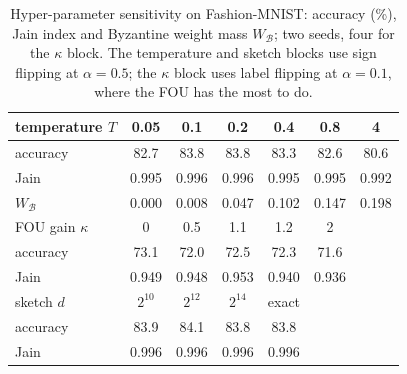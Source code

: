 \begin{table}[!t]
\centering
\caption{Hyper-parameter sensitivity on Fashion-MNIST: accuracy (\%), Jain index and Byzantine weight mass $W_{\mathcal{B}}$; two seeds, four for the $\kappa$ block. The temperature and sketch blocks use sign flipping at $\alpha=0.5$; the $\kappa$ block uses label flipping at $\alpha=0.1$, where the FOU has the most to do.}
\label{tab:sens}
\setlength{\tabcolsep}{3.2pt}
\footnotesize
\begin{tabular}{lcccccc}
\hline
temperature $T$ & 0.05 & 0.1 & 0.2 & 0.4 & 0.8 & 4\\
\hline
accuracy & 82.7 & 83.8 & 83.8 & 83.3 & 82.6 & 80.6\\
Jain & 0.995 & 0.996 & 0.996 & 0.995 & 0.995 & 0.992\\
$W_{\mathcal{B}}$ & 0.000 & 0.008 & 0.047 & 0.102 & 0.147 & 0.198\\
\hline
FOU gain $\kappa$ & 0 & 0.5 & 1.1 & 1.2 & 2 &\\
\hline
accuracy & 73.1 & 72.0 & 72.5 & 72.3 & 71.6 &\\
Jain & 0.949 & 0.948 & 0.953 & 0.940 & 0.936 &\\
\hline
sketch $d$ & $2^{10}$ & $2^{12}$ & $2^{14}$ & exact & &\\
\hline
accuracy & 83.9 & 84.1 & 83.8 & 83.8 & &\\
Jain & 0.996 & 0.996 & 0.996 & 0.996 & &\\
\hline
\end{tabular}
\end{table}
